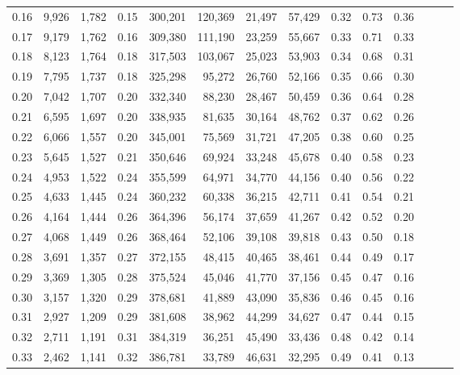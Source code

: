 \begin{tabular}{rrrrrrrrrrrrrr}
0.16 &   9,926 &  1,782 &  0.15 &  300,201 &  120,369 &  21,497 &  57,429 &  0.32 &  0.73 &      0.36 \\
0.17 &   9,179 &  1,762 &  0.16 &  309,380 &  111,190 &  23,259 &  55,667 &  0.33 &  0.71 &      0.33 \\
0.18 &   8,123 &  1,764 &  0.18 &  317,503 &  103,067 &  25,023 &  53,903 &  0.34 &  0.68 &      0.31 \\
0.19 &   7,795 &  1,737 &  0.18 &  325,298 &   95,272 &  26,760 &  52,166 &  0.35 &  0.66 &      0.30 \\
0.20 &   7,042 &  1,707 &  0.20 &  332,340 &   88,230 &  28,467 &  50,459 &  0.36 &  0.64 &      0.28 \\
0.21 &   6,595 &  1,697 &  0.20 &  338,935 &   81,635 &  30,164 &  48,762 &  0.37 &  0.62 &      0.26 \\
0.22 &   6,066 &  1,557 &  0.20 &  345,001 &   75,569 &  31,721 &  47,205 &  0.38 &  0.60 &      0.25 \\
0.23 &   5,645 &  1,527 &  0.21 &  350,646 &   69,924 &  33,248 &  45,678 &  0.40 &  0.58 &      0.23 \\
0.24 &   4,953 &  1,522 &  0.24 &  355,599 &   64,971 &  34,770 &  44,156 &  0.40 &  0.56 &      0.22 \\
0.25 &   4,633 &  1,445 &  0.24 &  360,232 &   60,338 &  36,215 &  42,711 &  0.41 &  0.54 &      0.21 \\
0.26 &   4,164 &  1,444 &  0.26 &  364,396 &   56,174 &  37,659 &  41,267 &  0.42 &  0.52 &      0.20 \\
0.27 &   4,068 &  1,449 &  0.26 &  368,464 &   52,106 &  39,108 &  39,818 &  0.43 &  0.50 &      0.18 \\
0.28 &   3,691 &  1,357 &  0.27 &  372,155 &   48,415 &  40,465 &  38,461 &  0.44 &  0.49 &      0.17 \\
0.29 &   3,369 &  1,305 &  0.28 &  375,524 &   45,046 &  41,770 &  37,156 &  0.45 &  0.47 &      0.16 \\
0.30 &   3,157 &  1,320 &  0.29 &  378,681 &   41,889 &  43,090 &  35,836 &  0.46 &  0.45 &      0.16 \\
0.31 &   2,927 &  1,209 &  0.29 &  381,608 &   38,962 &  44,299 &  34,627 &  0.47 &  0.44 &      0.15 \\
0.32 &   2,711 &  1,191 &  0.31 &  384,319 &   36,251 &  45,490 &  33,436 &  0.48 &  0.42 &      0.14 \\
0.33 &   2,462 &  1,141 &  0.32 &  386,781 &   33,789 &  46,631 &  32,295 &  0.49 &  0.41 &      0.13 \\

\end{tabular}
